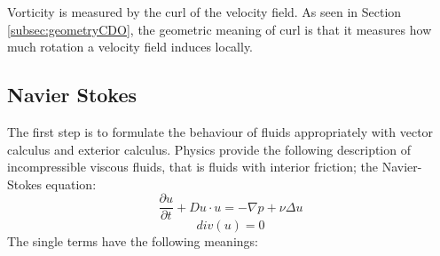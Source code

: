 Vorticity is measured by the curl of the velocity field. As seen in Section \ref{subsec:geometryCDO},  the geometric meaning of curl is that it measures how much rotation a velocity field induces locally.

\subsection{Navier Stokes}

The first step is to formulate the behaviour of fluids appropriately with vector calculus and exterior calculus. 
Physics provide the following description of incompressible viscous fluids, that is fluids with interior friction; the Navier-Stokes equation:
\[\frac{\partial u}{\partial t} + Du \cdot u = -\nabla p + \nu \Delta u\]
\begin{equation}div(u) = 0\label{eq:NS}\end{equation} 
The single terms have the following meanings:

